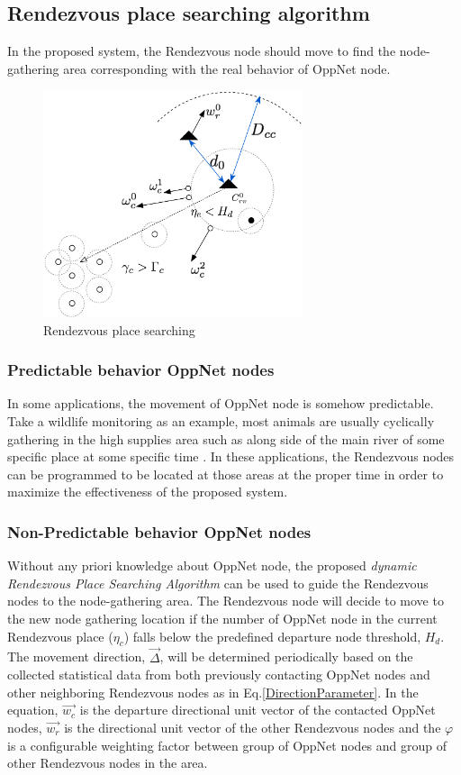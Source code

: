 \subsection{Rendezvous place searching algorithm}
In the proposed system, the Rendezvous node should move to find the node-gathering area corresponding with the real behavior of OppNet node.


\begin{figure}[!t]
	\centering
	\includegraphics[width=3in]{Figures/Dynamic.pdf}
	\caption{Rendezvous place searching}
	\label{Rendezvous node movements}
\end{figure}


\subsubsection{Predictable behavior OppNet nodes}
In some applications, the movement of OppNet node is somehow predictable.
Take a wildlife monitoring as an example, most animals are usually cyclically gathering in the high supplies area such as along side of the main river of some specific place at some specific time \cite{Yu2007a}.
In these applications, the Rendezvous nodes can be programmed to be located at those areas at the proper time in order to maximize the effectiveness of the proposed system.

\subsubsection{Non-Predictable behavior OppNet nodes}
Without any priori knowledge about OppNet node, the proposed \emph{dynamic Rendezvous Place Searching Algorithm} can be used to guide the Rendezvous nodes to the node-gathering area.
The Rendezvous node will decide to move to the new node gathering location if the number of OppNet node in the current Rendezvous place ($\eta_{c}$) falls below the predefined departure node threshold, $H_{d}$.
The movement direction, $\vec{\Delta}$, will be determined periodically based on the collected statistical data from both previously contacting OppNet nodes and other neighboring Rendezvous nodes as in Eq.\ref{DirectionParameter}.
In the equation, $\vec{w_c}$ is the departure directional unit vector of the contacted OppNet nodes, $\vec{w_r}$ is the directional unit vector of the other Rendezvous nodes and the $\varphi$ is a configurable weighting factor between group of OppNet nodes and group of other Rendezvous nodes in the area.

